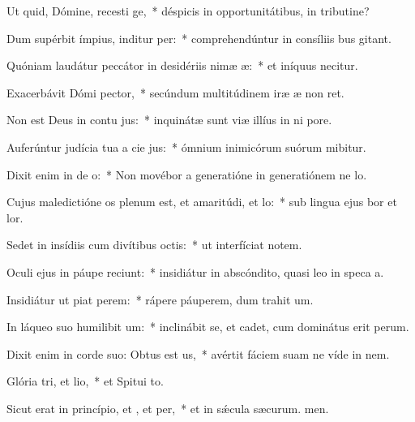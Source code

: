 \item Ut quid, Dómine, recesti ge,~* déspicis in opportunitátibus, in tributine?
\item Dum supérbit ímpius, inditur per:~* comprehendúntur in consíliis bus gitant.
\item Quóniam laudátur peccátor in desidériis nimæ æ:~* et iníquus necitur.
\item Exacerbávit Dómi pector,~* secúndum multitúdinem iræ æ non ret.
\item Non est Deus in contu jus:~* inquinátæ sunt viæ illíus in ni pore.
\item Auferúntur judícia tua a cie jus:~* ómnium inimicórum suórum mibitur.
\item Dixit enim in de o:~* Non movébor a generatióne in generatiónem ne lo.
\item Cujus maledictióne os plenum est, et amaritúdi, et lo:~* sub lingua ejus bor et lor.
\item Sedet in insídiis cum divítibus  octis:~* ut interfíciat notem.
\item Oculi ejus in páupe reciunt:~* insidiátur in abscóndito, quasi leo in speca a.
\item Insidiátur ut piat perem:~* rápere páuperem, dum trahit um.
\item In láqueo suo humilibit um:~* inclinábit se, et cadet, cum dominátus erit perum.
\item Dixit enim in corde suo: Obtus est us,~* avértit fáciem suam ne víde in nem.
\item Glória tri, et lio,~* et Spitui to.
\item Sicut erat in princípio, et , et per,~* et in sǽcula sæcurum. men.
